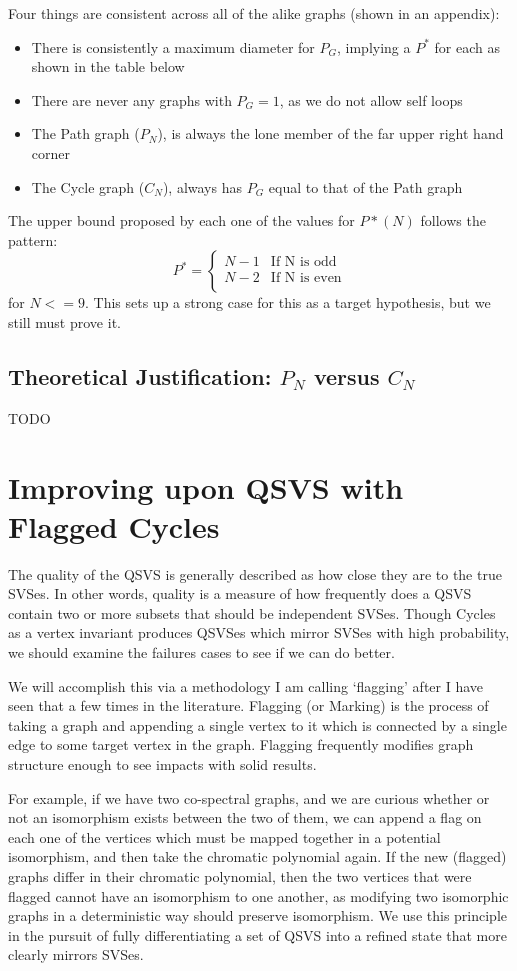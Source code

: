 Four things are consistent across all of the alike graphs (shown in an appendix):
\begin{itemize}
\item{There is consistently a maximum diameter for $P_G$, implying a $P^*$ for each as shown in the table below}
\item{There are never any graphs with $P_G = 1$, as we do not allow self loops }
\item{The Path graph ($P_N$), is always the lone member of the far upper right hand corner}
\item{The Cycle graph ($C_N$), always has $P_G$ equal to that of the Path graph}
\end{itemize}
The upper bound proposed by each one of the values for $P*(N)$ follows the pattern:
\[ P^* = \begin{cases} 
      N-1 & \text{If N is odd} \\
      N-2 & \text{If N is even} \\
   \end{cases}
\]
for $N <=9$. This sets up a strong case for this as a target hypothesis, but we still must prove it.

\subsection{Theoretical Justification: $P_N$ versus $C_N$}
TODO


\section{Improving upon QSVS with Flagged Cycles}

The quality of the QSVS is generally described as how close they are to the true SVSes.
In other words, quality is a measure of how frequently does a QSVS contain two or more subsets that should be independent SVSes.
Though Cycles as a vertex invariant produces QSVSes which mirror SVSes with high probability, we should examine the failures cases to see if we can do better.

We will accomplish this via a methodology I am calling `flagging' after I have seen that a few times in the literature.
Flagging (or Marking) is the process of taking a graph and appending a single vertex to it which is connected by a single edge to some target vertex in the graph.
Flagging frequently modifies graph structure enough to see impacts with solid results.

For example, if we have two co-spectral graphs, and we are curious whether or not an isomorphism exists between the two of them, we can append a flag on each one of the vertices which must be mapped together in a potential isomorphism, and then take the chromatic polynomial again.
If the new (flagged) graphs differ in their chromatic polynomial, then the two vertices that were flagged cannot have an isomorphism to one another, as modifying two isomorphic graphs in a deterministic way should preserve isomorphism.
We use this principle in the pursuit of fully differentiating a set of QSVS into a refined state that more clearly mirrors SVSes.

